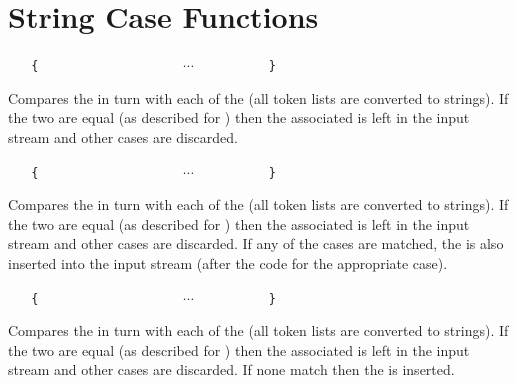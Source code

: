 \documentclass[oneside]{book}
\begin{document}
\section{String Case Functions}

\begin{function}{\StrCase}
\begin{syntax}
 
~ ~ \verb|{|
~ ~ ~ ~  
~ ~ ~ ~  
~ ~ ~ ~ $\cdots$
~ ~ ~ ~  
~ ~ \verb|}|
\end{syntax}
Compares the  in turn with each
of the  (all token lists are converted to strings).
If the two are equal (as described for
) then the associated  is left in the
input stream and other cases are discarded.
\end{function}

\begin{function}{\StrCaseT}
\begin{syntax}
 
~ ~ \verb|{|
~ ~ ~ ~  
~ ~ ~ ~  
~ ~ ~ ~ $\cdots$
~ ~ ~ ~  
~ ~ \verb|}|
~ ~ 
\end{syntax}
Compares the  in turn with each
of the  (all token lists are converted to strings).
If the two are equal (as described for
) then the associated  is left in the
input stream and other cases are discarded. If any of the
cases are matched, the  is also inserted into the
input stream (after the code for the appropriate case).
\end{function}

\begin{function}{\StrCaseF}
\begin{syntax}
 
~ ~ \verb|{|
~ ~ ~ ~  
~ ~ ~ ~  
~ ~ ~ ~ $\cdots$
~ ~ ~ ~  
~ ~ \verb|}|
~ ~ 
\end{syntax}
Compares the  in turn with each
of the  (all token lists are converted to strings).
If the two are equal (as described for
) then the associated  is left in the
input stream and other cases are discarded. If none
match then the  is inserted.
\end{function}
\end{document}
